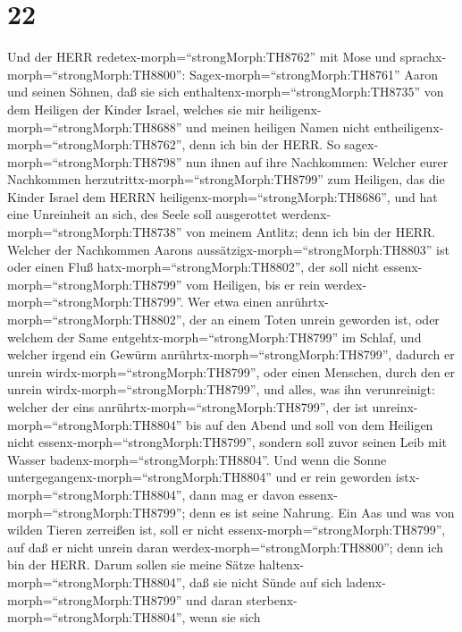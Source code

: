 \hypertarget{section-21}{%
\section{22}\label{section-21}}

 Und der HERR redetex-morph=``strongMorph:TH8762'' mit Mose
und sprachx-morph=``strongMorph:TH8800'': 
Sagex-morph=``strongMorph:TH8761'' Aaron und seinen Söhnen, daß sie sich
enthaltenx-morph=``strongMorph:TH8735'' von dem Heiligen der Kinder
Israel, welches sie mir heiligenx-morph=``strongMorph:TH8688'' und
meinen heiligen Namen nicht entheiligenx-morph=``strongMorph:TH8762'',
denn ich bin der HERR.  So
sagex-morph=``strongMorph:TH8798'' nun ihnen auf ihre Nachkommen:
Welcher eurer Nachkommen herzutrittx-morph=``strongMorph:TH8799'' zum
Heiligen, das die Kinder Israel dem HERRN
heiligenx-morph=``strongMorph:TH8686'', und hat eine Unreinheit an sich,
des Seele soll ausgerottet werdenx-morph=``strongMorph:TH8738'' von
meinem Antlitz; denn ich bin der HERR.  Welcher der
Nachkommen Aarons aussätzigx-morph=``strongMorph:TH8803'' ist oder einen
Fluß hatx-morph=``strongMorph:TH8802'', der soll nicht
essenx-morph=``strongMorph:TH8799'' vom Heiligen, bis er rein
werdex-morph=``strongMorph:TH8799''. Wer etwa einen
anrührtx-morph=``strongMorph:TH8802'', der an einem Toten unrein
geworden ist, oder welchem der Same
entgehtx-morph=``strongMorph:TH8799'' im Schlaf,  und
welcher irgend ein Gewürm anrührtx-morph=``strongMorph:TH8799'', dadurch
er unrein wirdx-morph=``strongMorph:TH8799'', oder einen Menschen, durch
den er unrein wirdx-morph=``strongMorph:TH8799'', und alles, was ihn
verunreinigt:  welcher der eins
anrührtx-morph=``strongMorph:TH8799'', der ist
unreinx-morph=``strongMorph:TH8804'' bis auf den Abend und soll von dem
Heiligen nicht essenx-morph=``strongMorph:TH8799'', sondern soll zuvor
seinen Leib mit Wasser badenx-morph=``strongMorph:TH8804''. 
Und wenn die Sonne untergegangenx-morph=``strongMorph:TH8804'' und er
rein geworden istx-morph=``strongMorph:TH8804'', dann mag er davon
essenx-morph=``strongMorph:TH8799''; denn es ist seine Nahrung.
 Ein Aas und was von wilden Tieren zerreißen ist, soll er
nicht essenx-morph=``strongMorph:TH8799'', auf daß er nicht unrein daran
werdex-morph=``strongMorph:TH8800''; denn ich bin der HERR. 
Darum sollen sie meine Sätze haltenx-morph=``strongMorph:TH8804'', daß
sie nicht Sünde auf sich ladenx-morph=``strongMorph:TH8799'' und daran
sterbenx-morph=``strongMorph:TH8804'', wenn sie sich
